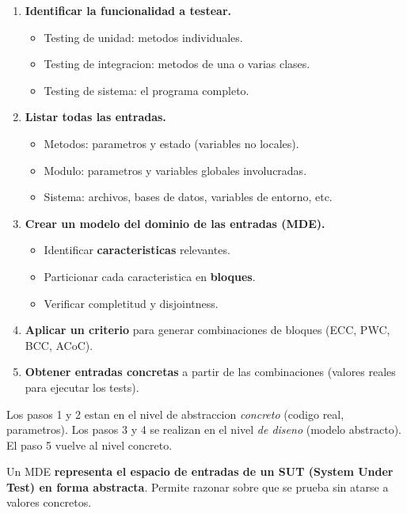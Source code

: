 \documentclass[12pt,a4paper]{article}
\begin{document}
\begin{enumerate}
  \item \textbf{Identificar la funcionalidad a testear.}
  \begin{itemize}
    \item Testing de unidad: metodos individuales.
    \item Testing de integracion: metodos de una o varias clases.
    \item Testing de sistema: el programa completo.
  \end{itemize}

  \item \textbf{Listar todas las entradas.}
  \begin{itemize}
    \item Metodos: parametros y estado (variables no locales).
    \item Modulo: parametros y variables globales involucradas.
    \item Sistema: archivos, bases de datos, variables de entorno, etc.
  \end{itemize}

  \item \textbf{Crear un modelo del dominio de las entradas (MDE).}
  \begin{itemize}
    \item Identificar \textbf{caracteristicas} relevantes.
    \item Particionar cada caracteristica en \textbf{bloques}.
    \item Verificar completitud y disjointness.
  \end{itemize}

  \item \textbf{Aplicar un criterio} para generar combinaciones de bloques (ECC, PWC, BCC, ACoC).

  \item \textbf{Obtener entradas concretas} a partir de las combinaciones (valores reales para
  ejecutar los tests).
\end{enumerate}

Los pasos 1 y 2 estan en el nivel de abstraccion \emph{concreto} (codigo real, parametros). Los
pasos 3 y 4 se realizan en el nivel \emph{de diseno} (modelo abstracto). El paso 5 vuelve al nivel
concreto.

\begin{ideabox}
Un MDE \textbf{representa el espacio de entradas de un SUT (System Under Test) en forma
abstracta}. Permite razonar sobre que se prueba sin atarse a valores concretos.
\end{ideabox}
\end{document}

